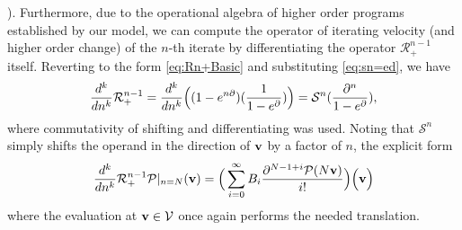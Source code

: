 \cite{apostol1999elementary}). Furthermore, due to the operational algebra of higher order programs established by our model, we can compute the operator of iterating velocity (and higher order change) of the $n$-th iterate by differentiating the operator $\mathcal{R}^{n-1}_+$ itself. Reverting to the form \eqref{eq:Rn+Basic} and substituting \eqref{eq:sn=ed}, we have
\begin{equation}
  \frac{d^k}{dn^k}\mathcal{R}^{n-1}_+=\frac{d^k}{dn^k}\Big((1-e^{n\partial})(\frac{1}{1-e^\partial})\Big)=\mathcal{S}^n(\frac{\partial^n}{1-e^\partial}),
   \end{equation}
where commutativity of shifting and differentiating was used. Noting that $\mathcal{S}^n$ simply shifts the operand in the direction of $\mathbf{v}$ by a factor of $n$, the explicit form 
\begin{equation}
        \frac{d^k}{dn^k}\mathcal{R}^{n-1}_+\mathcal{P}\vert_{n=N}(\mathbf{v})=\Big(\sum\limits_{i=0}^{\infty}B_i\frac{\partial^{N-1+i}\mathcal{P}(N\mathbf{v})}{i!}\Big)\Big(\mathbf{v}\Big)
        \end{equation}
where the evaluation at $\mathbf{v}\in \mathcal{V}$ once again performs the needed translation.

